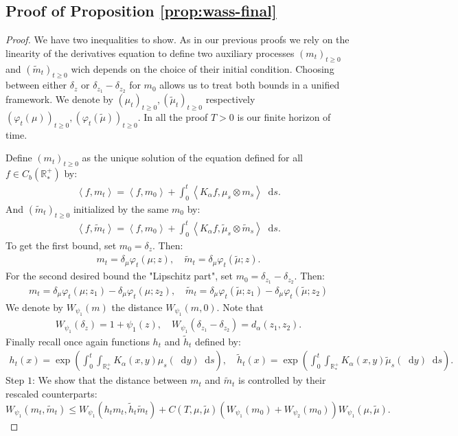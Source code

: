 \documentclass[11pt,a4paper]{article}
\newcommand{\RRP}{\mathbb{R}^+_*}
\newcommand{\Proc}[1]{\left(#1\right)_{t\geq 0}}
\newcommand{\brac}[1]{\left\langle#1\right\rangle}
\newcommand{\dd}{\mathop{}\!\mathrm{d}}
\begin{document}
\subsection{Proof of Proposition \ref{prop:wass-final}} 
\begin{proof}
    We have two inequalities to show. As in our previous proofs we rely on the linearity of the derivatives equation to define two auxiliary processes $\Proc{m_t}$ and $\Proc{\tilde{m}_t}$ wich depends on the choice of their initial condition. Choosing between either $\delta_z$ or $\delta_{z_1}-\delta_{z_2}$ for $m_0$ allows us to treat both bounds in a unified framework. We denote by $\Proc{\mu_t},\Proc{\tilde{\mu}_t}$ respectively $\Proc{\varphi_t(\mu)},\Proc{\varphi_t(\tilde{\mu})}$. In all the proof $T> 0$ is our finite horizon of time.
    
    
    Define $\Proc{m_t}$ as the unique solution of the equation defined for all $f \in C_b(\RRP)$ by:
    \begin{align*}
        \brac{f,m_t} = \brac{f,m_0} + \int_0^t \brac{K_\alpha f,\mu_s\otimes m_s} \dd s.
    \end{align*}
    And $\Proc{\tilde{m}_t}$ initialized by the same $m_0$ by:
    \begin{align*}
        \brac{f,\tilde{m}_t} = \brac{f,m_0} + \int_0^t \brac{K_\alpha f,\tilde{\mu}_s\otimes \tilde{m}_s} \dd s.
    \end{align*}
    To get the first bound, set $m_0 = \delta_z$. Then:
    \begin{align*}
        m_t = \delta_\mu \varphi_t(\mu;z) , \quad \tilde{m}_t = \delta_\mu \varphi_t(\tilde{\mu};z).
    \end{align*}
    For the second desired bound the "Lipschitz part", set $m_0 = \delta_{z_1} - \delta_{z_2}$. Then:
    \begin{align*}
        m_t = \delta_\mu \varphi_t(\mu;z_1) - \delta_\mu \varphi_t(\mu;z_2), \quad \tilde{m}_t = \delta_\mu \varphi_t(\tilde{\mu};z_1) - \delta_\mu \varphi_t(\tilde{\mu};z_2)
    \end{align*}
    We denote by $W_{\psi_1}(m)$ the distance $W_{\psi_1}(m,0)$. Note that 
    \begin{align*}
        W_{\psi_1}(\delta_z) = 1 + \psi_1(z) ,\quad W_{\psi_1}\left( \delta_{z_1} - \delta_{z_2}\right) = d_{\alpha}(z_1,z_2).
    \end{align*}
    Finally recall once again functions $h_t$ and $\tilde{h}_t$ defined by:
    \begin{align*}
        h_t(x) = \exp\left(\int_0^t \int_{\RRP} K_\alpha(x,y) \mu_s(\dd y)\dd s \right), \quad \tilde{h}_t(x) = \exp\left(\int_0^t \int_{\RRP} K_\alpha(x,y) \tilde{\mu}_s(\dd y)\dd s \right).
    \end{align*}
    Step $1$: We show that the distance between $m_t$ and $\tilde{m}_t$ is controlled by their rescaled counterparts:
    \[ W_{\psi_1}(m_t ,\tilde{m}_t) \leq W_{\psi_1}(h_tm_t , \tilde{h}_t\tilde{m}_t) + C(T,\mu,\tilde{\mu})\left(W_{\psi_1}(m_0) + W_{\psi_2}(m_0)\right)W_{\psi_1}(\mu,\tilde{\mu}).\]


\end{proof}
\end{document}

